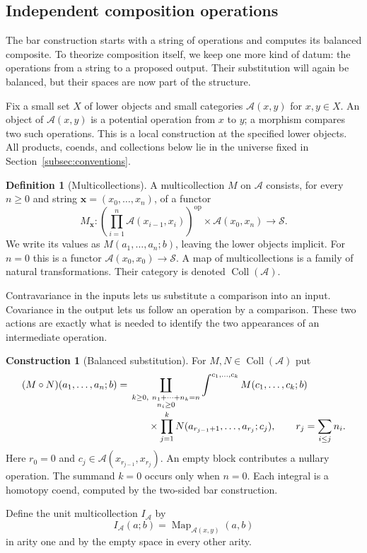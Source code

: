 \documentclass[oneside]{article}
\theoremstyle{plain}
\theoremstyle{definition}
\newtheorem{definition}[theorem]{Definition}
\newtheorem{construction}[theorem]{Construction}
\theoremstyle{remark}
\newcommand{\Map}{\operatorname{Map}}
\newcommand{\Sps}{\mathcal S}
\newcommand{\op}{\mathrm{op}}
\begin{document}
\subsection{Independent composition operations}
\label{subsec:independent-multikernels}

The bar construction starts with a string of operations and computes
its balanced composite. To theorize composition itself, we keep one
more kind of datum: the operations from a string to a proposed output.
Their substitution will again be balanced, but their spaces are now
part of the structure.

Fix a small set $X$ of lower objects and small categories
$\mathcal A(x,y)$ for $x,y\in X$. An object of $\mathcal A(x,y)$
is a potential operation from $x$ to $y$; a morphism compares two such
operations. This is a local construction at the specified lower
objects. All products, coends, and collections below lie in the
universe fixed in Section~\ref{subsec:conventions}.

\begin{definition}[Multicollections]\label{def:multicollections}
A multicollection $M$ on $\mathcal A$ consists, for every $n\geq0$
and string $\mathbf x=(x_0,\ldots,x_n)$, of a functor
\[
 M_{\mathbf x}:
 \left(\prod_{i=1}^n\mathcal A(x_{i-1},x_i)\right)^{\op}
 \times\mathcal A(x_0,x_n)\longrightarrow\Sps.
\]
We write its values as $M(a_1,\ldots,a_n;b)$, leaving the lower
objects implicit. For $n=0$ this is a functor
$\mathcal A(x_0,x_0)\to\Sps$. A map of multicollections is a family
of natural transformations. Their category is denoted
$\operatorname{Coll}(\mathcal A)$.
\end{definition}

Contravariance in the inputs lets us substitute a comparison into
an input. Covariance in the output lets us follow an operation by
a comparison. These two actions are exactly what is needed to
identify the two appearances of an intermediate operation.

\begin{construction}[Balanced substitution]\label{con:balanced-substitution}
For $M,N\in\operatorname{Coll}(\mathcal A)$ put
\begin{equation}\label{eq:multikernel-substitution}
\begin{split}
 (M\circ N)(a_1,\ldots,a_n;b)
 ={}&\coprod_{\substack{k\geq0,\ n_1+\cdots+n_k=n\\n_i\geq0}}
 \int^{c_1,\ldots,c_k}
 M(c_1,\ldots,c_k;b)\\[-2pt]
 &\hspace{1.8em}\times
 \prod_{j=1}^k
 N(a_{r_{j-1}+1},\ldots,a_{r_j};c_j),
 \qquad r_j=\sum_{i\leq j}n_i.
\end{split}
\end{equation}
Here $r_0=0$ and
$c_j\in\mathcal A(x_{r_{j-1}},x_{r_j})$.
An empty block contributes a nullary operation. The summand $k=0$
occurs only when $n=0$. Each integral is a homotopy coend, computed
by the two-sided bar construction.

Define the unit multicollection $I_{\mathcal A}$ by
\[
 I_{\mathcal A}(a;b)=\Map_{\mathcal A(x,y)}(a,b)
\]
in arity one and by the empty space in every other arity.
\end{construction}
\end{document}
